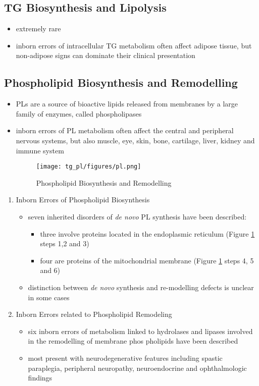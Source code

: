 \documentclass[12pt]{scrartcl}
\begin{document}
\subsection{TG Biosynthesis and Lipolysis}
\label{sec:orgb98ab1b}
\begin{itemize}
\item extremely rare
\item inborn errors of intracellular TG metabolism often affect adipose
tissue, but non-adipose signs can dominate their clinical
presentation
\end{itemize}

\subsection{Phospholipid Biosynthesis and Remodelling}
\label{sec:orgc76f340}
\begin{itemize}
\item PLs are a source of bioactive lipids released from
membranes by a large family of enzymes, called phospholipases
\item inborn errors of PL metabolism often affect the central and
peripheral nervous systems, but also muscle, eye, skin, bone,
cartilage, liver, kidney and immune system 

\begin{figure}[htbp]
\centering
\texttt{[image: tg\_pl/figures/pl.png]}
\caption{\label{fig:org9086d30}Phospholipid Biosynthesis and Remodelling}
\end{figure}
\end{itemize}

\begin{enumerate}
\item Inborn Errors of Phospholipid Biosynthesis
\label{sec:orgd77ef82}
\begin{itemize}
\item seven inherited disorders of \emph{de novo} PL synthesis have been described:
\begin{itemize}
\item three involve proteins located in the endoplasmic reticulum
(Figure \ref{fig:org9086d30} steps 1,2 and 3)
\item four are proteins of the mitochondrial membrane (Figure
\ref{fig:org9086d30} steps 4, 5 and 6)
\end{itemize}
\item distinction between \emph{de novo} synthesis and re-modelling defects is
unclear in some cases
\end{itemize}

\item Inborn Errors related to Phospholipid Remodeling
\label{sec:org2155ea2}
\begin{itemize}
\item six inborn errors of metabolism linked to hydrolases and lipases
involved in the remodelling of membrane phos pholipids have been
described
\item most present with neurodegenerative features including spastic
paraplegia, peripheral neuropathy, neuroendocrine and ophthalmologic
findings
\end{itemize}
\end{enumerate}
\end{document}
